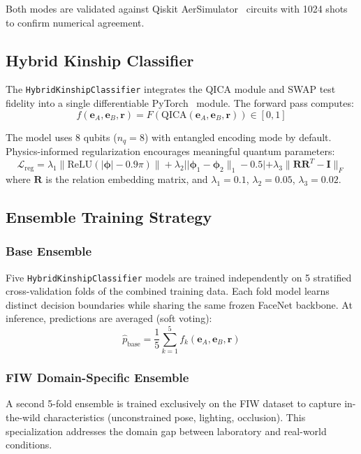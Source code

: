 \documentclass[journal,12pt]{IEEEtran}
\begin{document}
Both modes are validated against Qiskit AerSimulator~\cite{qiskit2024}
circuits with 1024 shots to confirm numerical agreement.

\subsection{Hybrid Kinship Classifier}
\label{sec:hybrid_classifier}

The \texttt{HybridKinshipClassifier} integrates the QICA module and SWAP
test fidelity into a single differentiable PyTorch~\cite{paszke2019pytorch}
module. The forward pass computes:
\begin{equation}
    f(\mathbf{e}_A, \mathbf{e}_B, \mathbf{r}) = F\!\left(
    \text{QICA}(\mathbf{e}_A, \mathbf{e}_B, \mathbf{r})\right) \in [0,1]
\end{equation}

The model uses 8 qubits ($n_q = 8$) with entangled encoding mode by
default. Physics-informed regularization encourages meaningful quantum
parameters:
\begin{equation}
    \mathcal{L}_{\text{reg}} = \lambda_1 \|\text{ReLU}(|\bm{\phi}| - 0.9\pi)\|
    + \lambda_2 ||\bm{\phi}_1 - \bm{\phi}_2\|_1 - 0.5|
    + \lambda_3 \|\mathbf{R}\mathbf{R}^T - \mathbf{I}\|_F
\end{equation}
where $\mathbf{R}$ is the relation embedding matrix, and $\lambda_1 = 0.1$,
$\lambda_2 = 0.05$, $\lambda_3 = 0.02$.

\subsection{Ensemble Training Strategy}
\label{sec:ensemble}

\subsubsection{Base Ensemble}
Five \texttt{HybridKinshipClassifier} models are trained independently
on 5 stratified cross-validation folds of the combined training data.
Each fold model learns distinct decision boundaries while sharing the
same frozen FaceNet backbone. At inference, predictions are averaged
(soft voting):
\begin{equation}
    \hat{p}_{\text{base}} = \frac{1}{5}\sum_{k=1}^{5} f_k(\mathbf{e}_A, \mathbf{e}_B, \mathbf{r})
\end{equation}

\subsubsection{FIW Domain-Specific Ensemble}
A second 5-fold ensemble is trained exclusively on the FIW dataset to
capture in-the-wild characteristics (unconstrained pose, lighting,
occlusion). This specialization addresses the domain gap between
laboratory and real-world conditions.
\end{document}
